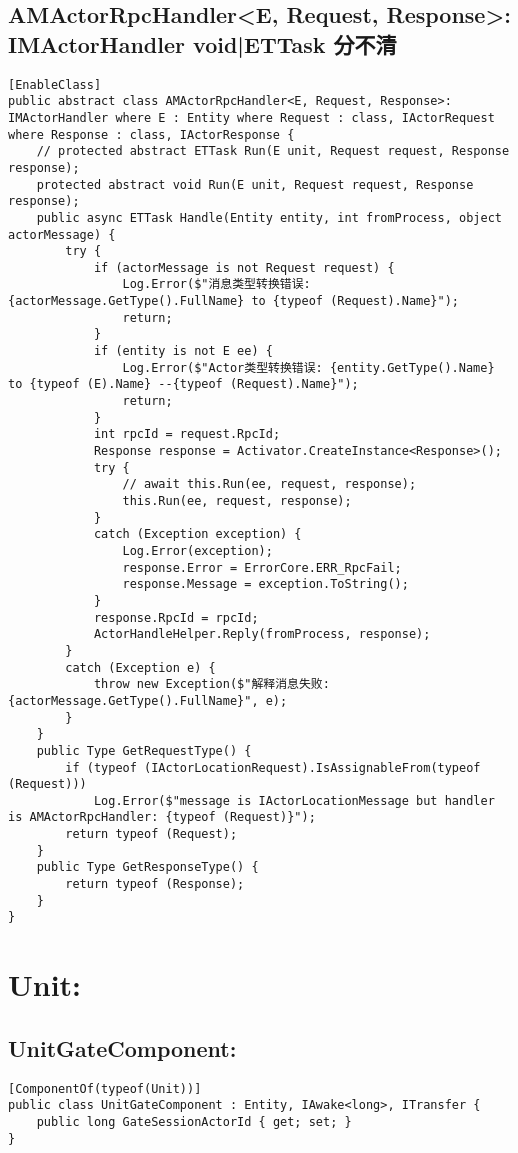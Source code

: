 \documentclass[9pt, b5paper]{article}
\begin{document}
\subsection{AMActorRpcHandler<E, Request, Response>: IMActorHandler void|ETTask 分不清}
\label{sec-7-3}
\begin{verbatim}
[EnableClass]
public abstract class AMActorRpcHandler<E, Request, Response>: IMActorHandler where E : Entity where Request : class, IActorRequest where Response : class, IActorResponse {
    // protected abstract ETTask Run(E unit, Request request, Response response);
    protected abstract void Run(E unit, Request request, Response response);
    public async ETTask Handle(Entity entity, int fromProcess, object actorMessage) {
        try {
            if (actorMessage is not Request request) {
                Log.Error($"消息类型转换错误: {actorMessage.GetType().FullName} to {typeof (Request).Name}");
                return;
            }
            if (entity is not E ee) {
                Log.Error($"Actor类型转换错误: {entity.GetType().Name} to {typeof (E).Name} --{typeof (Request).Name}");
                return;
            }
            int rpcId = request.RpcId;
            Response response = Activator.CreateInstance<Response>();
            try {
                // await this.Run(ee, request, response);
                this.Run(ee, request, response);
            }
            catch (Exception exception) {
                Log.Error(exception);
                response.Error = ErrorCore.ERR_RpcFail;
                response.Message = exception.ToString();
            }
            response.RpcId = rpcId;
            ActorHandleHelper.Reply(fromProcess, response);
        }
        catch (Exception e) {
            throw new Exception($"解释消息失败: {actorMessage.GetType().FullName}", e);
        }
    }
    public Type GetRequestType() {
        if (typeof (IActorLocationRequest).IsAssignableFrom(typeof (Request)))
            Log.Error($"message is IActorLocationMessage but handler is AMActorRpcHandler: {typeof (Request)}");
        return typeof (Request);
    }
    public Type GetResponseType() {
        return typeof (Response);
    }
}
\end{verbatim}

\section{Unit:}
\label{sec-8}
\subsection{UnitGateComponent:}
\label{sec-8-1}
\begin{verbatim}
[ComponentOf(typeof(Unit))]
public class UnitGateComponent : Entity, IAwake<long>, ITransfer {
    public long GateSessionActorId { get; set; }
}
\end{verbatim}
\end{document}
